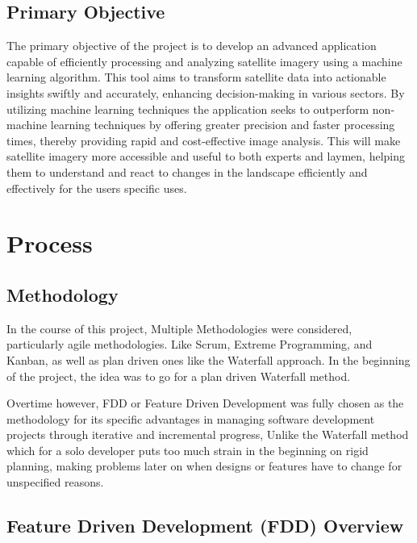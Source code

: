 \subsection{Primary Objective}\label{subsec:primary-objective}

The primary objective of the project is to develop an advanced application capable of efficiently processing and
analyzing satellite imagery using a machine learning algorithm.
This tool aims to transform satellite data into actionable insights swiftly and accurately, enhancing decision-making
in various sectors.
By utilizing machine learning techniques the application seeks to outperform non-machine learning techniques by offering greater precision and faster
processing times, thereby providing rapid and cost-effective image analysis.
This will make satellite imagery more accessible and useful to both experts and laymen, helping them to understand
and react to changes in the landscape efficiently and effectively for the users specific uses.



\section{Process}\label{sec:process}

\subsection{Methodology}\label{subsec:methodology}

In the course of this project, Multiple Methodologies were considered, particularly agile methodologies.
Like Scrum, Extreme Programming, and Kanban, as well as plan driven ones like the Waterfall approach.
In the beginning of the project, the idea was to go for a plan driven Waterfall method.

Overtime however, FDD or Feature Driven Development was fully chosen as the methodology for its specific advantages in
managing software development projects through iterative and incremental progress, Unlike the Waterfall method which for a solo
developer puts too much strain in the beginning on rigid planning, making problems later on when designs or features have
to change for unspecified reasons.

\subsection{Feature Driven Development (FDD) Overview}\label{subsec:feature-driven-development-(fdd)-overview}

